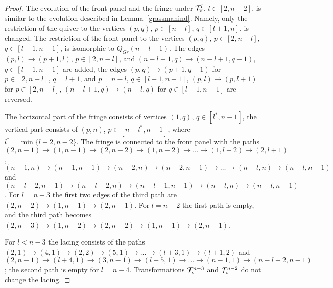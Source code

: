 \documentclass{amsart}
\theoremstyle{definition}
\theoremstyle{remark}
\numberwithin{equation}{section}
\numberwithin{theorem}{section}
\begin{document}
 \begin{proof} The evolution of the front panel and the fringe under ${{\mathcal T}}^{l}_{\mbox{\tiny\rm V}}$, $l\in 
[2,n-2]$, is similar to the evolution described in Lemma~\ref{grassmanind}. 
Namely, only the restriction of the quiver to the vertices $(p,q)$, $p\in [n-l]$, $q\in [l+1,n]$, 
is changed. The restriction of the front panel to the vertices $(p,q)$, $p\in [2,n-l]$, 
$q\in [l+1,n-1]$, is isomorphic to $Q_{Gr}(n-l-1)$.
The edges $(p,l)\to(p+1,l)$, $p\in [2,n-l]$, and $(n-l+1,q)\to(n-l+1,q-1)$, $q\in [l+1,n-1]$ 
are added, the edges $(p,q)\to(p+1,q-1)$ for $p\in[2,n-l]$, $q=l+1$, and $p=n-l$, $q\in[l+1,n-1]$,  $(p,l)\to(p,l+1)$ for $p\in[2,n-l]$, $(n-l+1,q)\to(n-l,q)$ for $q\in[l+1,n-1]$ are reversed.

 The horizontal part of the fringe consists of vertices $(1,q)$, $q\in [l^*,n-1]$, the vertical part
 consists of $(p,n)$, $p\in [n-l^*,n-1]$, where $l^*=\min\{l+2,n-2\}$. The fringe is connected to the front panel
 with the paths $(2,n-1)\to(1,n-1)\to(2,n-2)\to(1,n-2)\to\dots\to(1,l+2)\to(2,l+1)$, $(n-1,n)\to(n-1,n-1)
 \to(n-2,n)\to(n-2,n-1)\to\dots\to(n-l,n)\to(n-l,n-1)$ and $(n-l-2,n-1)\to(n-l-2,n)\to(n-l-1,n-1)\to(n-l,n)\to(n-l,n-1)$.
For $l=n-3$ the first two edges of the third path are $(2,n-2)\to(1,n-1)\to(2,n-1)$. For $l=n-2$ the first path is  
empty, and the third path becomes $(2,n-3)\to(1,n-2)\to(2,n-2)\to(1,n-1)\to(2,n-1)$.
 
For $l<n-3$ the lacing consists of the paths 
$(2,1)\to(4,1)\to(2,2)\to (5,1)\to\dots\to(l+3,1) \to(l+1,2)$ and
$(2,n-1)\to(l+4,1)\to(3,n-1)\to(l+5,1)\to\dots\to(n-1,1)\to(n-l-2,n-1)$; 
 the second path is empty for $l=n-4$. 
 Transformations ${{\mathcal T}}^{n-3}_{\mbox{\tiny\rm V}}$ and ${{\mathcal T}}^{n-2}_{\mbox{\tiny\rm V}}$ do not
 change the lacing.


\end{proof}
\end{document}
